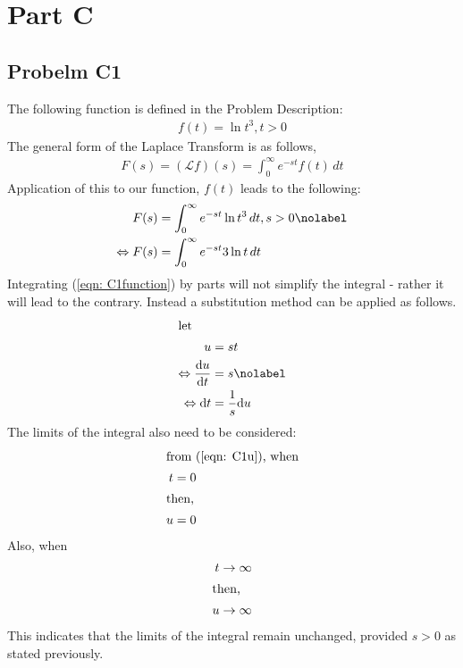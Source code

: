 \documentclass[a4paper,10pt,reqno]{amsart}
\numberwithin{equation}{section}
\begin{document}
\section{Part C}

\subsection{Probelm C1}\label{sec:c1}
The following function is defined in the Problem Description:
\begin{align}
f(t) = \ln t^3, t>0 \label{eqn: C1function}
\end{align}
The general form of the Laplace Transform is as follows,
\begin{align}
F(s) = (\mathscr{L}f)(s) =  \int_{0}^{\infty} e^{-st}f(t) \,dt  \label{eqn: Laplace}
\end{align}
Application of this to our function, $f(t)$ leads to the following:
\begin{align}
F(s) &= \int_{0}^{\infty} e^{-st} \ln t^3 \,dt, s>0  \nolabel \\
\Leftrightarrow F(s) &= \int_{0}^{\infty} e^{-st} 3\ln t \,dt  \label{eqn: C1beginning}
\end{align}
Integrating (\ref{eqn: C1function}) by parts will not simplify the integral - rather it will lead to the contrary. Instead a substitution method can be applied as follows.
\begin{align}
\intertext{let}
u &=st \label{eqn: C1u} \\
\Leftrightarrow \frac{\mathrm{d}u}{\mathrm{d}t} &= s \nolabel \\
\Leftrightarrow \mathrm{d}t &= \frac{1}{s} \mathrm{d}u \label{eqn: c1dt}
\end{align}
The limits of the integral also need to be considered:
\begin{align*}
\intertext{from (\ref{eqn: C1u}), when}
t &= 0 \\
\intertext{then,}
u &= 0
\end{align*}
Also, when
\begin{align*}
t \rightarrow \infty \\
\intertext{then,}
u \rightarrow \infty \\
\end{align*}
This indicates that the limits of the integral remain unchanged, provided $s>0$ as stated previously.
\end{document}
